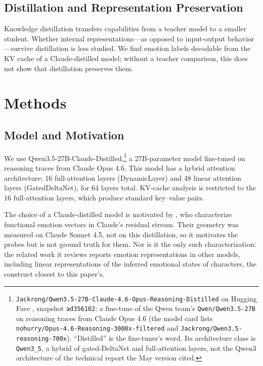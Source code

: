 \documentclass[11pt,a4paper]{article}
\begin{document}
\subsection{Distillation and Representation Preservation}

Knowledge distillation \citep{hinton2015distilling} transfers capabilities from a teacher model to a smaller student. Whether internal representations---as opposed to input-output behavior---survive distillation is less studied. We find emotion labels decodable from the KV cache of a Claude-distilled model; without a teacher comparison, this does not show that distillation preserves them.

\section{Methods}

\subsection{Model and Motivation}

We use Qwen3.5-27B-Claude-Distilled,\footnote{\texttt{Jackrong/Qwen3.5-27B-Claude-4.6-Opus-Reasoning-Distilled} on Hugging Face \citep{qwen35distilled}, snapshot \texttt{ad356102}: a fine-tune of the Qwen team's \texttt{Qwen/Qwen3.5-27B} \citep{qwen35base} on reasoning traces from Claude Opus 4.6 (the model card lists \texttt{nohurry/Opus-4.6-Reasoning-3000x-filtered} and \texttt{Jackrong/Qwen3.5-reasoning-700x}). ``Distilled'' is the fine-tuner's word. Its architecture class is \texttt{Qwen3\_5}, a hybrid of gated-DeltaNet and full-attention layers, not the Qwen3 architecture of the technical report the May version cited.} a 27B-parameter model fine-tuned on reasoning traces from Claude Opus 4.6. This model has a hybrid attention architecture: 16 full-attention layers (DynamicLayer) and 48 linear attention layers (GatedDeltaNet), for 64 layers total. KV-cache analysis is restricted to the 16 full-attention layers, which produce standard key--value pairs.

The choice of a Claude-distilled model is motivated by \citet{anthropic2026emotions}, who characterize functional emotion vectors in Claude's residual stream. Their geometry was measured on Claude Sonnet 4.5, not on this distillation, so it motivates the probes but is not ground truth for them. Nor is it the only such characterization: the related work it reviews reports emotion representations in other models, including linear representations of the inferred emotional states of characters, the construct closest to this paper's.
\end{document}
